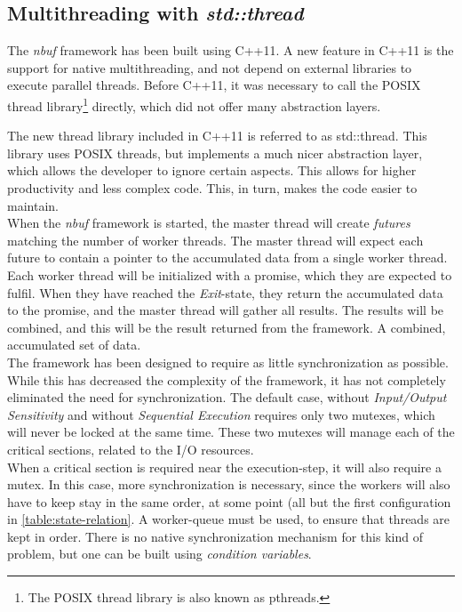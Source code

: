 \documentclass[a4paper]{article}
\newcommand{\nbuf}{\textit{nbuf} }
\begin{document}
\subsection{Multithreading with \textit{std::thread}}
The \nbuf framework has been built using C++11. A new feature in C++11 is the support for native multithreading, and not depend on external libraries to execute parallel threads. Before C++11, it was necessary to call the POSIX thread library\footnote{The POSIX thread library is also known as pthreads.} directly, which did not offer many abstraction layers. 

The new thread library included in C++11 is referred to as std::thread. This library uses POSIX threads, but implements a much nicer abstraction layer, which allows the developer to ignore certain aspects. This allows for higher productivity and less complex code. This, in turn, makes the code easier to maintain.\\

When the \nbuf framework is started, the master thread will create \textit{futures} matching the number of worker threads. The master thread will expect each future to contain a pointer to the accumulated data from a single worker thread. Each worker thread will be initialized with a promise, which they are expected to fulfil. When they have reached the \textit{Exit}-state, they return the accumulated data to the promise, and the master thread will gather all results. The results will be combined, and this will be the result returned from the framework. A combined, accumulated set of data.\\

The framework has been designed to require as little synchronization as possible. While this has decreased the complexity of the framework, it has not completely eliminated the need for synchronization. The default case, without \textit{Input/Output Sensitivity} and without \textit{Sequential Execution} requires only two mutexes, which will never be locked at the same time. These two mutexes will manage each of the critical sections, related to the I/O resources. \\

When a critical section is required near the execution-step, it will also require a mutex. In this case, more synchronization is necessary, since the workers will also have to keep stay in the same order, at some point (all but the first configuration in \autoref{table:state-relation}. A worker-queue must be used, to ensure that threads are kept in order. There is no native synchronization mechanism for this kind of problem, but one can be built using \textit{condition variables}.\\
\end{document}
